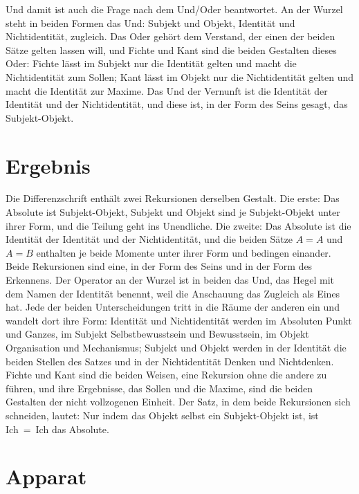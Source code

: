 \documentclass[11pt,a4paper]{article}
\newcommand{\SO}{Subjekt-Objekt}
\begin{document}
Und damit ist auch die Frage nach dem Und/Oder beantwortet. An der Wurzel steht in beiden Formen das Und: Subjekt und Objekt, Identität und Nichtidentität, zugleich. Das Oder gehört dem Verstand, der einen der beiden Sätze gelten lassen will, und Fichte und Kant sind die beiden Gestalten dieses Oder: Fichte lässt im Subjekt nur die Identität gelten und macht die Nichtidentität zum Sollen; Kant lässt im Objekt nur die Nichtidentität gelten und macht die Identität zur Maxime. Das Und der Vernunft ist die Identität der Identität und der Nichtidentität, und diese ist, in der Form des Seins gesagt, das \SO{}.

\section{Ergebnis}

Die Differenzschrift enthält zwei Rekursionen derselben Gestalt. Die erste: Das Absolute ist \SO{}, Subjekt und Objekt sind je \SO{} unter ihrer Form, und die Teilung geht ins Unendliche. Die zweite: Das Absolute ist die Identität der Identität und der Nichtidentität, und die beiden Sätze $A = A$ und $A = B$ enthalten je beide Momente unter ihrer Form und bedingen einander. Beide Rekursionen sind eine, in der Form des Seins und in der Form des Erkennens. Der Operator an der Wurzel ist in beiden das Und, das Hegel mit dem Namen der Identität benennt, weil die Anschauung das Zugleich als Eines hat. Jede der beiden Unterscheidungen tritt in die Räume der anderen ein und wandelt dort ihre Form: Identität und Nichtidentität werden im Absoluten Punkt und Ganzes, im Subjekt Selbstbewusstsein und Bewusstsein, im Objekt Organisation und Mechanismus; Subjekt und Objekt werden in der Identität die beiden Stellen des Satzes und in der Nichtidentität Denken und Nichtdenken. Fichte und Kant sind die beiden Weisen, eine Rekursion ohne die andere zu führen, und ihre Ergebnisse, das Sollen und die Maxime, sind die beiden Gestalten der nicht vollzogenen Einheit. Der Satz, in dem beide Rekursionen sich schneiden, lautet: Nur indem das Objekt selbst ein \SO{} ist, ist Ich~=~Ich das Absolute.

\clearpage
\section*{Apparat}
\end{document}
